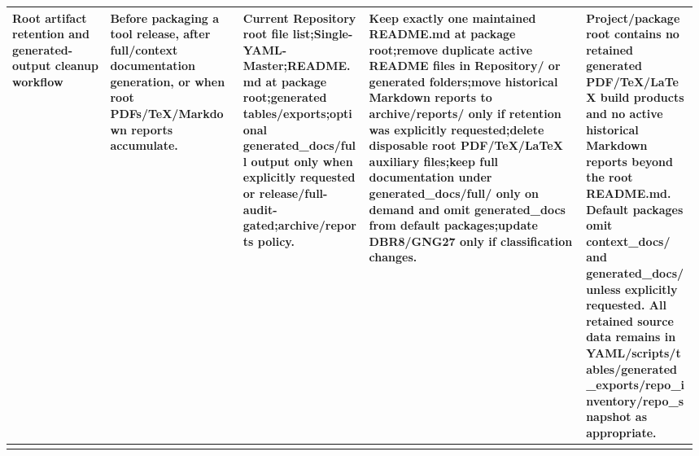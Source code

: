 \begin{longtable}{L{0.14\linewidth} L{0.19\linewidth} L{0.18\linewidth} L{0.31\linewidth} L{0.16\linewidth}}
\hline
\addlinespace[0.24em]
Root artifact retention and generated-output cleanup workflow & Before packaging a tool release, after full/\allowbreak{}context documentation generation, or when root PDFs/\allowbreak{}TeX/\allowbreak{}Markdown reports accumulate. & Current Repository root file list;\newline Single-YAML-Master;\newline README.md at package root;\newline generated tables/\allowbreak{}exports;\newline optional generated\_docs/\allowbreak{}full output only when explicitly requested or release/\allowbreak{}full-audit-gated;\newline archive/\allowbreak{}reports policy. & Keep exactly one maintained README.md at package root;\newline remove duplicate active README files in Repository/\allowbreak{} or generated folders;\newline move historical Markdown reports to archive/\allowbreak{}reports/\allowbreak{} only if retention was explicitly requested;\newline delete disposable root PDF/\allowbreak{}TeX/\allowbreak{}LaTeX auxiliary files;\newline keep full documentation under generated\_docs/\allowbreak{}full/\allowbreak{} only on demand and omit generated\_docs from default packages;\newline update DBR8/\allowbreak{}GNG27 only if classification changes. & Project/\allowbreak{}package root contains no retained generated PDF/\allowbreak{}TeX/\allowbreak{}LaTeX build products and no active historical Markdown reports beyond the root README.md. Default packages omit context\_docs/\allowbreak{} and generated\_docs/\allowbreak{} unless explicitly requested. All retained source data remains in YAML/\allowbreak{}scripts/\allowbreak{}tables/\allowbreak{}generated\_exports/\allowbreak{}repo\_inventory/\allowbreak{}repo\_snapshot as appropriate.\\
\hline
\addlinespace[0.24em]

\end{longtable}
